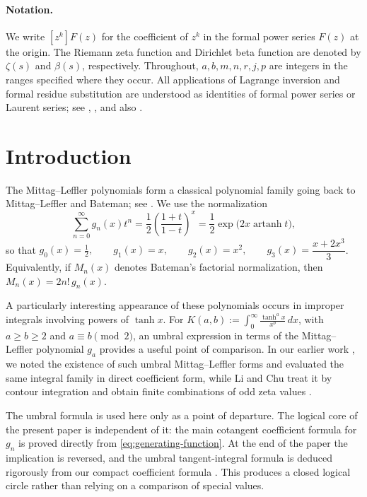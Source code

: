 \documentclass[11pt,twoside]{article}
\numberwithin{equation}{section}
\begin{document}
\vspace{0.2cm}

\paragraph{Notation.}
We write $[z^k]F(z)$ for the coefficient of $z^k$ in the formal power
series $F(z)$ at the origin.  The Riemann zeta function and Dirichlet
beta function are denoted by $\zeta(s)$ and $\beta(s)$, respectively.
Throughout, $a,b,m,n,r,j,p$ are integers in the ranges specified where
they occur.  All applications of Lagrange inversion and formal residue
substitution are understood as identities of formal power series or
Laurent series; see \cite[Chap.~III]{Comtet1974},
\cite[Sec.~I.5]{FlajoletSedgewick2009}, and also
\cite{Gessel2016,SuryaWarnke2023}.

\vspace{0.5cm}

\section*{Introduction}

The Mittag--Leffler polynomials form a classical polynomial family going
back to Mittag--Leffler and Bateman; see \cite{MittagLeffler1891,Bateman1940}.
We use the normalization
\begin{equation}
\label{eq:generating-function}
\sum_{n=0}^{\infty}g_n(x)t^n
=\frac12\left(\frac{1+t}{1-t}\right)^x
=\frac12\exp\!\bigl(2x\operatorname{artanh}t\bigr),
\end{equation}
so that
\(g_0(x)=\frac12,\qquad g_1(x)=x,\qquad g_2(x)=x^2,\qquad g_3(x)=\dfrac{x+2x^3}{3}\).
Equivalently, if $M_n(x)$ denotes Bateman's factorial normalization,
then
\(M_n(x)=2n!\,g_n(x)\).

A particularly interesting appearance of these polynomials occurs in
improper integrals involving powers of $\tanh x$.  For \( \displaystyle K(a,b):=\int_0^\infty\frac{\tanh^a x}{x^b}\,dx\), with \(a\ge b\ge2\) and \(a\equiv b\pmod2\),
an umbral expression in terms of the Mittag--Leffler polynomial $g_a$
provides a useful point of comparison.  In our earlier work
\cite[Remark~4.7]{TallaWaffo2026}, we noted the existence of such umbral
Mittag--Leffler forms and evaluated the same integral family in direct
coefficient form, while Li and Chu treat it by contour integration and
obtain finite combinations of odd zeta values \cite{LiChu2024}.

The umbral formula is used here only as a point of departure.  The logical
core of the present
paper is independent of it: the main cotangent coefficient formula for
$g_n$ is proved directly from \eqref{eq:generating-function}.  At the end
of the paper the implication is reversed, and the umbral tangent-integral
formula is deduced rigorously from our compact coefficient formula
\cite{TallaWaffo2026}.  This produces a closed logical circle rather than
relying on a comparison of special values.
\end{document}

